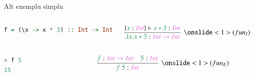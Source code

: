 \documentclass[xcolor=pdftex,romanian,colorlinks]{beamer}
\begin{document}
\begin{frame}[fragile]{Alt exemplu simplu}

\begin{columns}
\begin{column}{0.65\textwidth}
\begin{lstlisting}[language=Haskell]
f = (\x -> x * 3) :: Int -> Int
\end{lstlisting}
\end{column}

\begin{column}{0.4\textwidth}
\[
\infer[\onslide<1>{(fun_I)}]
	{{\color{True}\lambda x.x * 3} : \sel{Int \to Int}}
	{
	\{{\color{True}x} : \sel{Int}\} \vdash {\color{True}x * 3} : \sel{Int} 
	}
\]
\end{column}
\end{columns}

 \vspace{.6cm}

\begin{columns}
\begin{column}{0.65\textwidth}
\begin{lstlisting}[language=Haskell]
> f 5
15
\end{lstlisting}
\end{column}

\begin{column}{0.4\textwidth}
\[
\infer[\onslide<1>{(fun_E)}]
	{{\color{True}f\ 5} : \sel{Int}}
	{{\color{True}f} : \sel{Int \to Int} \quad {\color{True}5} : \sel{Int}}
\]
\end{column}
\end{columns}

\end{frame}
\end{document}
